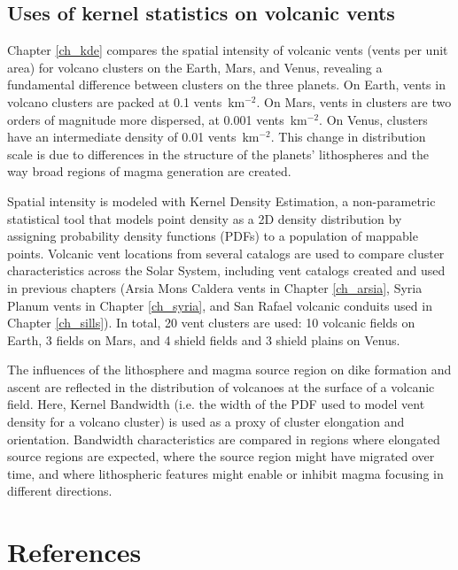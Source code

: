 \subsection{Uses of kernel statistics on volcanic vents}
Chapter \ref{ch_kde} compares the spatial intensity of volcanic vents (vents per unit area) for volcano clusters on the Earth, Mars, and Venus, revealing a fundamental difference between clusters on the three planets. On Earth, vents in volcano clusters are packed at 0.1 vents~km$^{-2}$. On Mars, vents in clusters are two orders of magnitude more dispersed, at 0.001 vents~km$^{-2}$. On Venus, clusters have an intermediate density of 0.01 vents~km$^{-2}$. This change in distribution scale is due to differences in the structure of the planets' lithospheres and the way broad regions of magma generation are created.

Spatial intensity is modeled with Kernel Density Estimation, a non-parametric statistical tool that models point density as a 2D density distribution by assigning probability density functions (PDFs) to a population of mappable points. Volcanic vent locations from several catalogs are used to compare cluster characteristics across the Solar System, including vent catalogs created and used in previous chapters (Arsia Mons Caldera vents in Chapter \ref{ch_arsia}, Syria Planum vents in Chapter \ref{ch_syria}, and San Rafael volcanic conduits used in Chapter \ref{ch_sills}). In total, 20 vent clusters are used: 10 volcanic fields on Earth, 3 fields on Mars, and 4 shield fields and 3 shield plains on Venus. 

The influences of the lithosphere and magma source region on dike formation and ascent are reflected in the distribution of volcanoes at the surface of a volcanic field. Here, Kernel Bandwidth (i.e. the width of the PDF used to model vent density for a volcano cluster) is used as a proxy of cluster elongation and orientation. Bandwidth characteristics are compared in regions where elongated source regions are expected, where the source region might have migrated over time, and where lithospheric features might enable or inhibit magma focusing in different directions.


\section{References}
